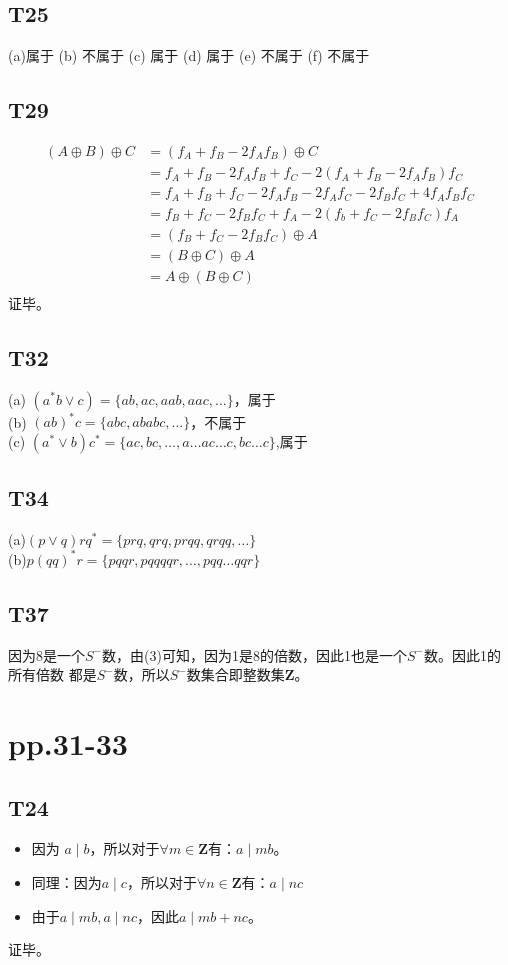\documentclass{article}
\begin{document}
\subsection{T25}
(a)属于 \quad (b) 不属于 \quad (c) 属于 \quad (d) 属于 \quad (e) 不属于 \quad (f) 不属于

\subsection{T29}
\begin{align*}
    (A \oplus B) \oplus C &= (f_A + f_B - 2f_Af_B) \oplus C\\
    &= f_A + f_B - 2f_Af_B + f_C - 2(f_A + f_B - 2f_Af_B)f_C\\
    &= f_A + f_B + f_C - 2f_Af_B - 2f_Af_C - 2f_Bf_C + 4f_Af_Bf_C\\
    &= f_B + f_C - 2f_Bf_C + f_A - 2(f_b + f_C - 2f_Bf_C)f_A\\
    &= (f_B + f_C - 2f_Bf_C) \oplus A\\
    &= (B \oplus C) \oplus A\\
    &= A \oplus (B \oplus C)\\
\end{align*}证毕。

\subsection{T32}\noindent
(a) $(a^* b \lor c) = \{ab, ac, aab, aac, \dots\}$，属于\\
(b) $(ab)^*c = \{abc, ababc, \dots\}$，不属于\\
(c) $(a^* \lor b)c^* = \{ac, bc, \dots,  a \dots ac \dots c, bc \dots c\}$,属于

\subsection{T34}
(a)$(p \lor q)rq^* = \{prq, qrq, prqq, qrqq, \dots \}$\\
(b)$p(qq)^*r = \{pqqr, pqqqqr, \dots ,pqq \dots qqr\}$
\subsection{T37}
因为8是一个$S^-$数，由(3)可知，因为1是8的倍数，因此1也是一个$S^-$数。因此1的所有倍数
都是$S^-$数，所以$S^-$数集合即整数集$\mathbf{Z}$。
\section{pp.31-33}
\subsection{T24}
\begin{itemize}
    \item 因为 $a \mid b$，所以对于$\forall m \in \mathbf{Z}$有：$a \mid mb$。
    \item 同理：因为$a \mid c$，所以对于$\forall n \in \mathbf{Z}$有：$a \mid nc$
    \item 由于$a \mid mb, a \mid nc$，因此$a \mid mb + nc$。
\end{itemize}
证毕。
\end{document}
